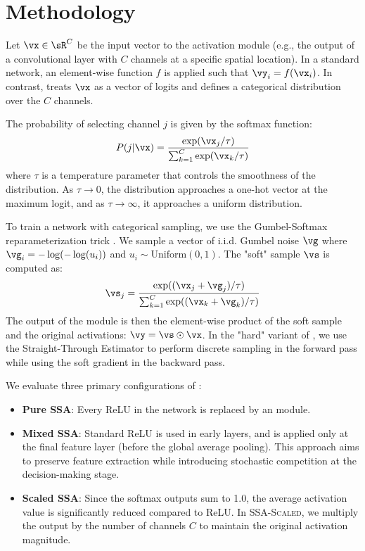 \section{Methodology}

Let $\vx \in \sR^C$ be the input vector to the activation module (e.g., the output of a convolutional layer with $C$ channels at a specific spatial location). In a standard network, an element-wise function $f$ is applied such that $\vy_i = f(\vx_i)$. In contrast, \methodname treats $\vx$ as a vector of logits and defines a categorical distribution over the $C$ channels.

The probability of selecting channel $j$ is given by the softmax function:
\begin{equation}
    P(j | \vx) = \frac{\exp(\vx_j / \tau)}{\sum_{k=1}^C \exp(\vx_k / \tau)}
\end{equation}
where $\tau$ is a temperature parameter that controls the smoothness of the distribution. As $\tau \to 0$, the distribution approaches a one-hot vector at the maximum logit, and as $\tau \to \infty$, it approaches a uniform distribution.

To train a network with categorical sampling, we use the Gumbel-Softmax reparameterization trick \cite{gumbel1998}. We sample a vector of i.i.d. Gumbel noise $\vg$ where $\vg_i = -\log(-\log(u_i))$ and $u_i \sim \text{Uniform}(0, 1)$. The "soft" sample $\vs$ is computed as:
\begin{equation}
    \vs_j = \frac{\exp((\vx_j + \vg_j) / \tau)}{\sum_{k=1}^C \exp((\vx_k + \vg_k) / \tau)}
\end{equation}
The output of the \methodname module is then the element-wise product of the soft sample and the original activations: $\vy = \vs \odot \vx$. In the "hard" variant of \methodname, we use the Straight-Through Estimator to perform discrete sampling in the forward pass while using the soft gradient in the backward pass.

We evaluate three primary configurations of \methodname:
\begin{itemize}[leftmargin=*,itemsep=0pt,topsep=0pt]
    \item {\bf Pure \textsc{SSA}}: Every ReLU in the network is replaced by an \methodname module.
    \item {\bf Mixed \textsc{SSA}}: Standard ReLU is used in early layers, and \methodname is applied only at the final feature layer (before the global average pooling). This approach aims to preserve feature extraction while introducing stochastic competition at the decision-making stage.
    \item {\bf Scaled \textsc{SSA}}: Since the softmax outputs sum to 1.0, the average activation value is significantly reduced compared to ReLU. In \textsc{SSA-Scaled}, we multiply the output by the number of channels $C$ to maintain the original activation magnitude.
\end{itemize}

